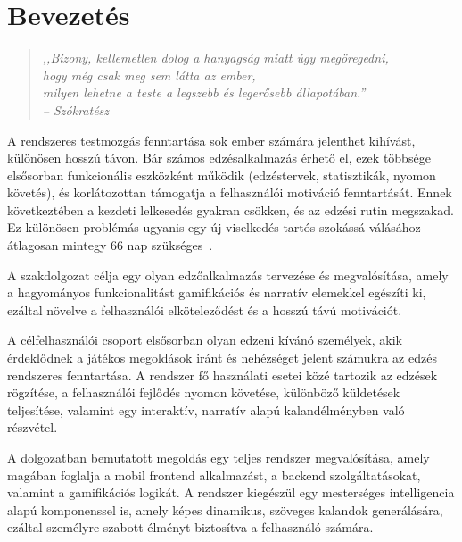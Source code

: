 \documentclass[
]{thesis-ekf}
\theoremstyle{definition}
\theoremstyle{remark}
\begin{document}

\tableofcontents

\chapter*{Bevezetés}

\begin{quote}
\centering
\label{quote_socrates}
    \emph{,,Bizony, kellemetlen dolog a hanyagság miatt úgy megöregedni, \\hogy még csak meg sem látta az ember, \\milyen lehetne a teste a legszebb és legerősebb állapotában.''\\ -- Szókratész~\cite{xenophon_memorabilia, nemeth1986}}
\end{quote}


A rendszeres testmozgás fenntartása sok ember számára jelenthet kihívást, különösen hosszú távon. Bár számos edzésalkalmazás érhető el, ezek többsége elsősorban funkcionális eszközként működik (edzéstervek, statisztikák, nyomon követés), és korlátozottan támogatja a felhasználói motiváció fenntartását. Ennek következtében a kezdeti lelkesedés gyakran csökken, és az edzési rutin megszakad. Ez különösen problémás ugyanis egy új viselkedés tartós szokássá válásához átlagosan mintegy 66 nap szükséges~\cite{lally2010habits}.

A szakdolgozat célja egy olyan edzőalkalmazás tervezése és megvalósítása, amely a hagyományos funkcionalitást gamifikációs és narratív elemekkel egészíti ki, ezáltal növelve a felhasználói elköteleződést és a hosszú távú motivációt.

A célfelhasználói csoport elsősorban olyan edzeni kívánó személyek, akik érdeklődnek a játékos megoldások iránt és nehézséget jelent számukra az edzés rendszeres fenntartása. A rendszer fő használati esetei közé tartozik az edzések rögzítése, a felhasználói fejlődés nyomon követése, különböző küldetések teljesítése, valamint egy interaktív, narratív alapú kalandélményben való részvétel.

A dolgozatban bemutatott megoldás egy teljes rendszer megvalósítása, amely magában foglalja a mobil frontend alkalmazást, a backend szolgáltatásokat, valamint a gamifikációs logikát. A rendszer kiegészül egy mesterséges intelligencia alapú komponenssel is, amely képes dinamikus, szöveges kalandok generálására, ezáltal személyre szabott élményt biztosítva a felhasználó számára.
\end{document}
